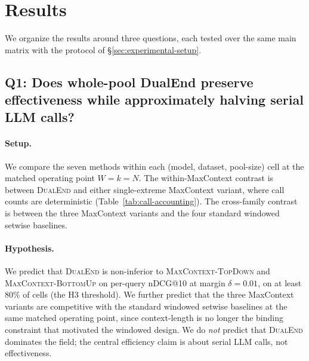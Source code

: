 \section{Results}
\label{sec:results}


We organize the results around three questions, each tested over the same main matrix with the protocol of \S\ref{sec:experimental-setup}.

\subsection{Q1: Does whole-pool DualEnd preserve effectiveness while approximately halving serial LLM calls?}
\label{sec:results-cost-quality}

\paragraph{Setup.}
We compare the seven methods within each (model, dataset, pool-size) cell at the matched operating point $W{=}k{=}N$. The within-MaxContext contrast is between \textsc{DualEnd} and either single-extreme MaxContext variant, where call counts are deterministic (Table~\ref{tab:call-accounting}). The cross-family contrast is between the three MaxContext variants and the four standard windowed setwise baselines.

\paragraph{Hypothesis.}
We predict that \textsc{DualEnd} is non-inferior to
\textsc{MaxContext-TopDown} and \textsc{MaxContext-BottomUp} on per-query nDCG@10 at margin $\delta{=}0.01$, on at least 80\% of cells (the H3 threshold). We further predict that the three MaxContext variants are competitive with the standard windowed setwise baselines at the same matched operating point, since context-length is no longer the binding constraint that motivated the windowed design. We do \emph{not} predict that \textsc{DualEnd} dominates the field; the central efficiency claim is about serial LLM calls, not effectiveness.

